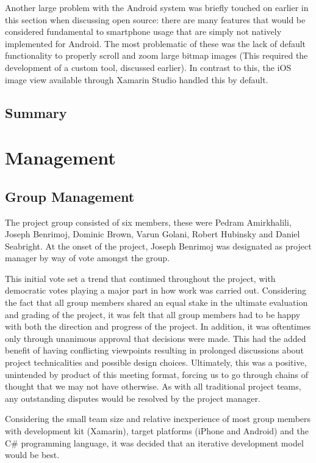 \documentclass[12pt,a4paper]{report}
\begin{document}
Another large problem with the Android system was briefly touched on earlier in this section when discussing open source: there are many features that would be considered fundamental to smartphone usage that are simply not natively implemented for Android. The most problematic of these was the lack of default functionality to properly scroll and zoom large bitmap images (This required the development of a custom tool, discussed earlier). In contrast to this, the iOS image view available through Xamarin Studio handled this by default.    

\section{Summary}

\chapter{Management}

\section{Group Management}
The project group consisted of six members, these were Pedram Amirkhalili, Joseph Benrimoj, Dominic Brown, Varun Golani, Robert Hubinsky and Daniel Seabright. At the onset of the project, Joseph Benrimoj was designated as project manager by way of vote amongst the group.

This initial vote set a trend that continued throughout the project, with democratic votes playing a major part in how work was carried out. Considering the fact that all group members shared an equal stake in the ultimate evaluation and grading of the project, it was felt that all group members had to be happy with both the direction and progress of the project. In addition, it was oftentimes only through unanimous approval that decisions were made. This had the added benefit of having conflicting viewpoints resulting in prolonged discussions about project technicalities and possible design choices. Ultimately, this was a positive, unintended by product of this meeting format, forcing us to go through chains of thought that we may not have otherwise. As with all traditional project teams, any outstanding disputes would be resolved by the project manager.

Considering the small team size and relative inexperience of most group members with development kit (Xamarin), target platforms (iPhone and Android) and the C\# programming language, it was decided that an iterative development model would be best.
\end{document}
